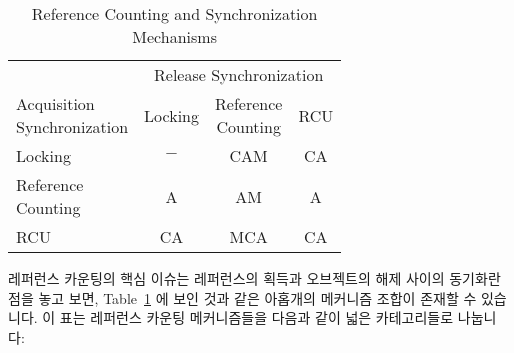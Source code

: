 \begin{table}[tb]
\renewcommand*{\arraystretch}{1.25}
\small
\centering
\begin{tabular}{lccc}
	\toprule
	& \multicolumn{3}{c}{Release Synchronization} \\
	\cmidrule(l){2-4}
	\parbox[c]{.8in}{Acquisition\\Synchronization}
			& Locking
				& \parbox[c]{.5in}{Reference\\Counting}
				        & RCU \\
	 \cmidrule(l){2-4}
	Locking		& $-$	  & CAM	      & CA  \\
	\parbox[c][6ex]{.8in}{Reference\\Counting}
			& A	  & AM        & A   \\
	RCU		& CA	  & MCA	      & CA  \\
	\bottomrule
\end{tabular}
\caption{Reference Counting and Synchronization Mechanisms}
\label{tab:together:Reference Counting and Synchronization Mechanisms}
\end{table}

레퍼런스 카운팅의 핵심 이슈는 레퍼런스의 획득과 오브젝트의 해제 사이의 동기화란
점을 놓고 보면,
Table~\ref{tab:together:Reference Counting and Synchronization Mechanisms} 에
보인 것과 같은 아홉개의 메커니즘 조합이 존재할 수 있습니다.
이 표는 레퍼런스 카운팅 메커니즘들을 다음과 같이 넓은 카테고리들로 나눕니다:
\iffalse

